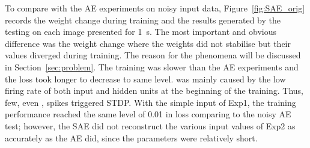 To compare with the AE experiments on noisy input data, Figure~\ref{fig:SAE_orig} records the weight change during training and the results generated by the testing on each image presented for 1~s.
The most important and obvious difference was the weight change where the weights did not stabilise but their values diverged during training.
The reason for the phenomena will be discussed in Section~\ref{sec:problem}.
The training was slower than the AE experiments and the loss took longer \DIFdelbegin {}\DIFdelend to decrease to \DIFdelbegin {}\DIFdelend \DIFaddbegin {}\DIFaddend same level.
\DIFdelbegin {}\DIFdelend \DIFaddbegin {}\DIFaddend was mainly caused by the low firing rate of both input and hidden units at the beginning of the training.
Thus, few, even \DIFdelbegin {}\DIFdelend \DIFaddbegin {}\DIFaddend , spikes triggered STDP.
With the simple input of Exp1, the training performance reached the same level of 0.01 in loss comparing to the noisy AE test;
however, the SAE did not reconstruct the various input values of Exp2 as accurately as the AE did, since the parameters \DIFdelbegin {}\DIFdelend \DIFaddbegin {}\DIFaddend were relatively short.

